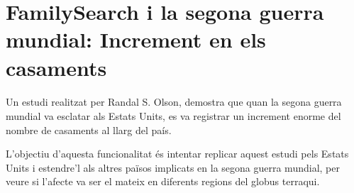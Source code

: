 \section{FamilySearch i la segona guerra mundial: Increment en els casaments}

    \paragraph{}
    Un estudi realitzat per Randal S. Olson, demostra que quan la segona guerra mundial va esclatar als Estats Units, es va registrar un increment enorme del nombre de casaments al llarg del país.

    L'objectiu d'aquesta funcionalitat és intentar replicar aquest estudi pels Estats Units i estendre'l als altres països implicats en la segona guerra mundial, per veure si l'afecte va ser el mateix en diferents regions del globus terraqui.
